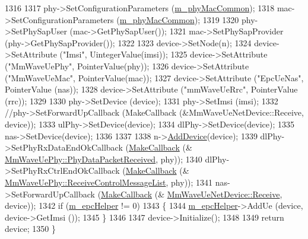 \begin{DoxyCode}
1316 
1317         phy->SetConfigurationParameters (\hyperlink{classns3_1_1MmWaveHelper_a6aaa35de743b9a88998de0128b1046b4}{m\_phyMacCommon});
1318         mac->SetConfigurationParameters (\hyperlink{classns3_1_1MmWaveHelper_a6aaa35de743b9a88998de0128b1046b4}{m\_phyMacCommon});
1319 
1320         phy->SetPhySapUser (mac->GetPhySapUser());
1321         mac->SetPhySapProvider (phy->GetPhySapProvider());
1322 
1323         device->SetNode(n);
1324         device->SetAttribute (\textcolor{stringliteral}{"Imsi"}, UintegerValue(imsi));
1325         device->SetAttribute (\textcolor{stringliteral}{"MmWaveUePhy"}, PointerValue(phy));
1326         device->SetAttribute (\textcolor{stringliteral}{"MmWaveUeMac"}, PointerValue(mac));
1327         device->SetAttribute (\textcolor{stringliteral}{"EpcUeNas"}, PointerValue (nas));
1328         device->SetAttribute (\textcolor{stringliteral}{"mmWaveUeRrc"}, PointerValue (rrc));
1329 
1330         phy->SetDevice (device);
1331         phy->SetImsi (imsi);
1332         \textcolor{comment}{//phy->SetForwardUpCallback (MakeCallback (&MmWaveUeNetDevice::Receive, device));}
1333         ulPhy->SetDevice(device);
1334         dlPhy->SetDevice(device);
1335         nas->SetDevice(device);
1336 
1337 
1338         n->\hyperlink{classns3_1_1Node_a42ff83ee1d5d1649c770d3f5b62375de}{AddDevice}(device);
1339         dlPhy->SetPhyRxDataEndOkCallback (\hyperlink{group__makecallbackmemptr_ga9376283685aa99d204048d6a4b7610a4}{MakeCallback} (&
      \hyperlink{classns3_1_1MmWaveUePhy_a439193d17fd93b179faa9db76f2b84af}{MmWaveUePhy::PhyDataPacketReceived}, phy));
1340         dlPhy->SetPhyRxCtrlEndOkCallback (\hyperlink{group__makecallbackmemptr_ga9376283685aa99d204048d6a4b7610a4}{MakeCallback} (&
      \hyperlink{classns3_1_1MmWaveUePhy_a1c3001d74628f40e38c1b4a04eac5015}{MmWaveUePhy::ReceiveControlMessageList}, phy));
1341         nas->SetForwardUpCallback (\hyperlink{group__makecallbackmemptr_ga9376283685aa99d204048d6a4b7610a4}{MakeCallback} (&
      \hyperlink{classns3_1_1MmWaveNetDevice_a89410619e5b6def2634940a9ab827d38}{MmWaveUeNetDevice::Receive}, device));
1342         \textcolor{keywordflow}{if} (\hyperlink{classns3_1_1MmWaveHelper_a03b33f9a2480a4cdd8ffe697ccc08e9e}{m\_epcHelper} != 0)
1343         \{
1344                 \hyperlink{classns3_1_1MmWaveHelper_a03b33f9a2480a4cdd8ffe697ccc08e9e}{m\_epcHelper}->AddUe (device, device->GetImsi ());
1345         \}
1346 
1347         device->Initialize();
1348 
1349         \textcolor{keywordflow}{return} device;
1350 \}
\end{DoxyCode}


